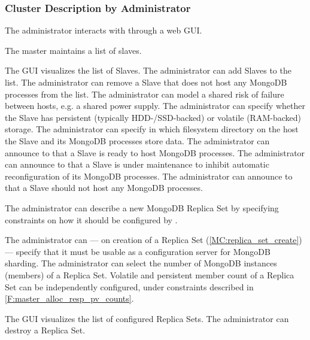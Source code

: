 \subsubsection{Cluster Description by Administrator}
\begin{description}
	
	 The administrator interacts with \mamid through a web GUI. \done
	
	 The master maintains a list of slaves. \done
	\begin{description}
		 The GUI visualizes the list of Slaves. \done
		 The administrator can add Slaves to the list. \done
		 The administrator can remove a Slave that does not host any MongoDB processes from the 
		list. \done
		 The administrator can model a shared risk of failure between hosts, e.g. a shared power 
		supply. \done
		 The administrator can specify whether the Slave has persistent (typically HDD-/SSD-backed) or 
		volatile (RAM-backed) storage. \done
		 The administrator can specify in which filesystem directory on the host the Slave 
		and its MongoDB processes store data. %
		 The administrator can announce to \mamid that a Slave is ready to host MongoDB processes. 
		\done
		 The administrator can announce to \mamid that a Slave is under maintenance to inhibit 
		automatic reconfiguration of its MongoDB processes. \done %
		 The administrator can announce to \mamid that a Slave should not host any MongoDB processes. 
		\done
	\end{description}
	
	 The administrator can describe a new MongoDB Replica Set by specifying constraints on 
	how it should be configured by \mamid. \done
	\begin{description}
		 The administrator can --- on creation of a Replica Set 
		(\ref{MC:replica_set_create}) --- specify that it must be usable as a configuration server for MongoDB sharding. 
		\done
		 The administrator can select the number of MongoDB instances (members) of a 
		Replica Set. \done
		 Volatile and persistent member count of a Replica Set can be independently 
		configured, under constraints described in \ref{F:master_alloc_resp_pv_counts}. \done
	\end{description}
	 The GUI visualizes the list of configured Replica Sets. \done
	 The administrator can destroy a Replica Set. \done
	
\end{description}

